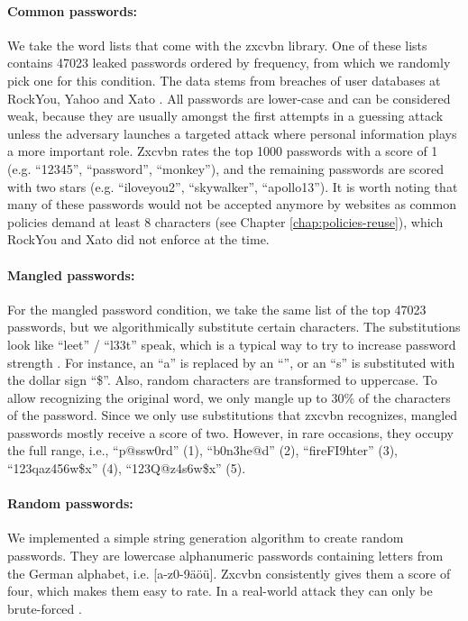 \paragraph{Common passwords: } We take the word lists that come with the zxcvbn library. One of these lists contains 47023 leaked passwords ordered by frequency, from which we randomly pick one for this condition. The data stems from breaches of user databases at RockYou, Yahoo and Xato \cite{Wheeler2016zxcvbn}. All passwords are lower-case and can be considered weak, because they are usually amongst the first attempts in a guessing attack \cite{Ur2015MeasuringRealWorldAccuracies} unless the adversary launches a targeted attack where personal information plays a more important role. Zxcvbn rates the top 1000 passwords with a score of 1 (e.g. ``12345'', ``password'', ``monkey''), and the remaining passwords are scored with two stars (e.g. ``iloveyou2'', ``skywalker'', ``apollo13''). It is worth noting that many of these passwords would not be accepted anymore by websites as common policies demand at least 8 characters (see Chapter \ref{chap:policies-reuse}), which RockYou and Xato did not enforce at the time. %

\paragraph{Mangled passwords: } For the mangled password condition, we take the same list of the top 47023 passwords, but we algorithmically substitute certain characters. The substitutions look like ``leet''  / ``l33t'' speak, which is a typical way to try to increase password strength \cite{Das2014TangledWeb, Mazurek2013Measuring}. For instance, an ``a'' is replaced by an ``\@'', or an ``s'' is substituted with the dollar sign ``\$''. Also, random characters are transformed to uppercase. To allow recognizing the original word, we only mangle up to 30\% of the characters of the password. Since we only use substitutions that zxcvbn recognizes, mangled passwords mostly receive a score of two. However, in rare occasions, they occupy the full range, i.e., ``p@ssw0rd'' (1), ``b0n3he@d'' (2), ``fireFI9hter'' (3), ``123qaz456w\$x'' (4), ``123Q@z4s6w\$x'' (5). 

\paragraph{Random passwords: } We implemented a simple string generation algorithm to create random passwords. They are lowercase alphanumeric passwords containing letters from the German alphabet, i.e. [a-z0-9äöü]. Zxcvbn consistently gives them a score of four, which makes them easy to rate. In a real-world attack they can only be brute-forced \cite{Florencio2014AdministratorsGuide, Wheeler2016zxcvbn}.

